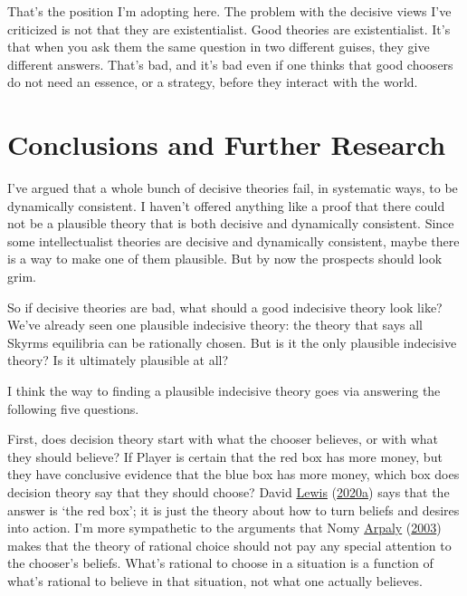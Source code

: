 \documentclass[
  12pt,
]{article}
\begin{document}
That's the position I'm adopting here. The problem with the decisive
views I've criticized is not that they are existentialist. Good theories
are existentialist. It's that when you ask them the same question in two
different guises, they give different answers. That's bad, and it's bad
even if one thinks that good choosers do not need an essence, or a
strategy, before they interact with the world.

\hypertarget{conclusions-and-further-research}{%
\section{Conclusions and Further
Research}\label{conclusions-and-further-research}}

I've argued that a whole bunch of decisive theories fail, in systematic
ways, to be dynamically consistent. I haven't offered anything like a
proof that there could not be a plausible theory that is both decisive
and dynamically consistent. Since some intellectualist theories are
decisive and dynamically consistent, maybe there is a way to make one of
them plausible. But by now the prospects should look grim.

So if decisive theories are bad, what should a good indecisive theory
look like? We've already seen one plausible indecisive theory: the
theory that says all Skyrms equilibria can be rationally chosen. But is
it the only plausible indecisive theory? Is it ultimately plausible at
all?

I think the way to finding a plausible indecisive theory goes via
answering the following five questions.

First, does decision theory start with what the chooser believes, or
with what they should believe? If Player is certain that the red box has
more money, but they have conclusive evidence that the blue box has more
money, which box does decision theory say that they should choose? David
\protect\hyperlink{ref-Lewis-Mellor-14101981}{Lewis}
(\protect\hyperlink{ref-Lewis-Mellor-14101981}{2020a}) says that the
answer is `the red box'; it is just the theory about how to turn beliefs
and desires into action. I'm more sympathetic to the arguments that Nomy
\protect\hyperlink{ref-Arpaly2003}{Arpaly}
(\protect\hyperlink{ref-Arpaly2003}{2003}) makes that the theory of
rational choice should not pay any special attention to the chooser's
beliefs. What's rational to choose in a situation is a function of
what's rational to believe in that situation, not what one actually
believes.
\end{document}
